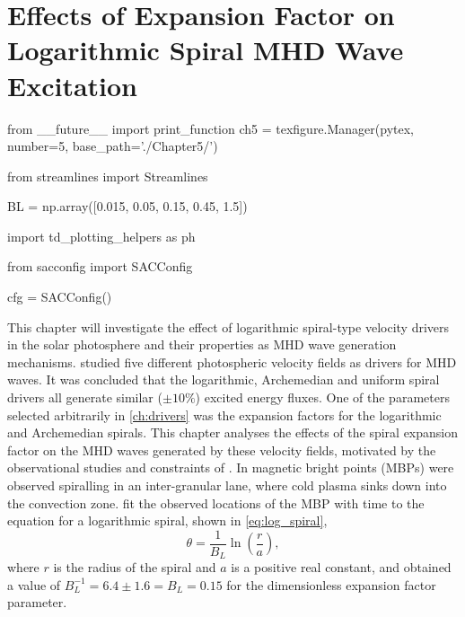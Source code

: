 
\chapter{Effects of Expansion Factor on Logarithmic Spiral MHD Wave Excitation}\label{ch:expfac}

\begin{pycode}[chapter5]
from __future__ import print_function
ch5 = texfigure.Manager(pytex, number=5, base_path='./Chapter5/')

from streamlines import Streamlines

BL = np.array([0.015, 0.05, 0.15, 0.45, 1.5])

import td_plotting_helpers as ph

from sacconfig import SACConfig

cfg = SACConfig()
\end{pycode}

This chapter will investigate the effect of logarithmic spiral-type velocity drivers in the solar photosphere and their properties as MHD wave generation mechanisms.
 studied five different photospheric velocity fields as drivers for MHD waves.
It was concluded that the logarithmic, Archemedian and uniform spiral drivers all generate similar ($\pm 10\%$) excited energy fluxes.
One of the parameters selected arbitrarily in \cref{ch:drivers} was the expansion factors for the logarithmic and Archemedian spirals.
This chapter analyses the effects of the spiral expansion factor on the MHD waves generated by these velocity fields, motivated by the observational studies and constraints of \cite{bonet2008}.
In \cite{bonet2008} magnetic bright points (MBPs) were observed spiralling in an inter-granular lane, where cold plasma sinks down into the convection zone.
\cite{bonet2008} fit the observed locations of the MBP with time to the equation for a logarithmic spiral, shown in \cref{eq:log_spiral},
\begin{equation}
\theta = \frac{1}{B_L}\ln\left(\frac{r}{a}\right),
\label{eq:log_spiral}
\end{equation}
where $r$ is the radius of the spiral and $a$ is a positive real constant, and obtained a value of $B_L^{-1} = 6.4 \pm 1.6 = B_L = 0.15$ for the dimensionless expansion factor parameter.

